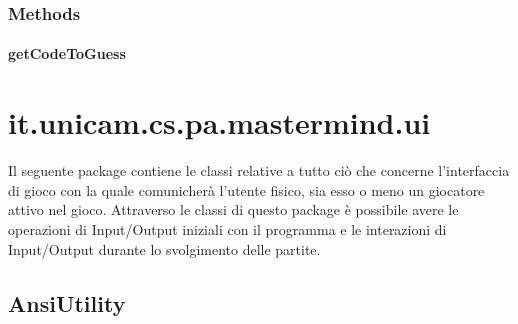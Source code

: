\documentclass[letterpaper,10pt,italian,openany,oneside]{sphinxmanual}
\begin{document}
\subsubsection{Methods}
\label{\detokenize{source/it/unicam/cs/pa/mastermind/players/RandomBotMaker:methods}}

\paragraph{getCodeToGuess}
\label{\detokenize{source/it/unicam/cs/pa/mastermind/players/RandomBotMaker:getcodetoguess}}

\begin{fulllineitems}
\label{\detokenize{source/it/unicam/cs/pa/mastermind/players/RandomBotMaker:it.unicam.cs.pa.mastermind.players.RandomBotMaker.getCodeToGuess()}}
\end{fulllineitems}



\section{it.unicam.cs.pa.mastermind.ui}
\label{\detokenize{source/it/unicam/cs/pa/mastermind/ui/package-index:it-unicam-cs-pa-mastermind-ui}}\label{\detokenize{source/it/unicam/cs/pa/mastermind/ui/package-index::doc}}
Il seguente package contiene le classi relative a tutto ciò che concerne l’interfaccia di gioco con la quale comunicherà l’utente fisico, sia esso o meno un giocatore attivo nel gioco. Attraverso le classi di questo package è possibile avere le operazioni di Input/Output iniziali con il programma e le interazioni di Input/Output durante lo svolgimento delle partite.

\label{\detokenize{source/it/unicam/cs/pa/mastermind/ui/package-index:package-it.unicam.cs.pa.mastermind.ui}}

\subsection{AnsiUtility}
\label{\detokenize{source/it/unicam/cs/pa/mastermind/ui/AnsiUtility:ansiutility}}\label{\detokenize{source/it/unicam/cs/pa/mastermind/ui/AnsiUtility::doc}}
\end{document}
